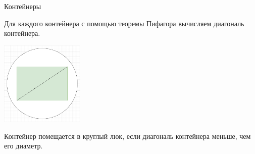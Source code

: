 \begin{tutorial}{Контейнеры}

Для каждого контейнера с помощью теоремы Пифагора вычисляем диагональ контейнера.

\begin{center}
\includegraphics[width=4cm]{1.png}
\end{center}

Контейнер помещается в круглый люк, если диагональ контейнера меньше, чем его диаметр.

\end{tutorial}
